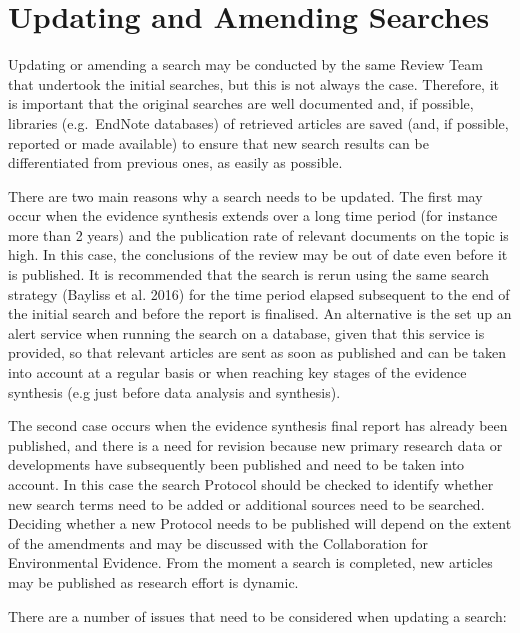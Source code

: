 \documentclass[
  letterpaper,
  DIV=11,
  numbers=noendperiod]{scrreprt}
\begin{document}
\section{Updating and Amending Searches}\label{sec-updateSearch}

Updating or amending a search may be conducted by the same Review Team
that undertook the initial searches, but this is not always the case.
Therefore, it is important that the original searches are well
documented and, if possible, libraries (e.g.~EndNote databases) of
retrieved articles are saved (and, if possible, reported or made
available) to ensure that new search results can be differentiated from
previous ones, as easily as possible.

There are two main reasons why a search needs to be updated. The first
may occur when the evidence synthesis extends over a long time period
(for instance more than 2 years) and the publication rate of relevant
documents on the topic is high. In this case, the conclusions of the
review may be out of date even before it is published. It is recommended
that the search is rerun using the same search strategy (Bayliss et al.
2016) for the time period elapsed subsequent to the end of the initial
search and before the report is finalised. An alternative is the set up
an alert service when running the search on a database, given that this
service is provided, so that relevant articles are sent as soon as
published and can be taken into account at a regular basis or when
reaching key stages of the evidence synthesis (e.g just before data
analysis and synthesis).

The second case occurs when the evidence synthesis final report has
already been published, and there is a need for revision because new
primary research data or developments have subsequently been published
and need to be taken into account. In this case the search Protocol
should be checked to identify whether new search terms need to be added
or additional sources need to be searched. Deciding whether a new
Protocol needs to be published will depend on the extent of the
amendments and may be discussed with the Collaboration for Environmental
Evidence. From the moment a search is completed, new articles may be
published as research effort is dynamic.

There are a number of issues that need to be considered when updating a
search:
\end{document}
